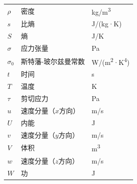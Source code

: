 \begin{longtable}{@{}lll@{}}
    $\rho$          & 密度                      & kg/m\textsuperscript{3} \\
    $s$             & 比熵                      & J/(kg·K) \\
    $S$             & 熵                        & J/K \\
    $\sigma$        & 应力张量                  & Pa \\
    $\sigma_0$      & 斯特藩-玻尔兹曼常数       & W/(m\textsuperscript{2}·K\textsuperscript{4}) \\
    $t$             & 时间                      & s \\
    $T$             & 温度                      & K \\
    $\tau$          & 剪切应力                  & Pa \\
    $u$             & 速度分量（$x$方向）       & m/s \\
    $U$             & 内能                      & J \\
    $v$             & 速度分量（$y$方向）       & m/s \\
    $V$             & 体积                      & m\textsuperscript{3} \\
    $w$             & 速度分量（$z$方向）       & m/s \\
    $W$             & 功                        & J \\
\end{longtable}